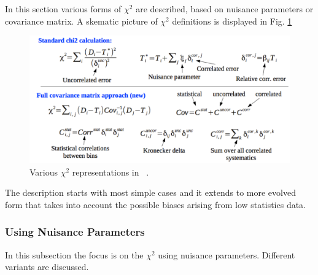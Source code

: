\label{sec:chi2}
In this section various forms of $\chi^2$ are described, based on nuisance parameters or
covariance matrix.
A skematic picture of $\chi^2$ definitions is displayed in Fig. \ref{fig:chi2}
\begin{figure}
\begin{center}
\includegraphics[width=0.75\linewidth]{figures/chi2.pdf}
\end{center}
\caption{Various $\chi^2$ representations in \fitter\ .}
\label{fig:chi2}
\end{figure}
 The description starts with most simple cases and it extends to 
 more evolved form that takes into account the
 possible biases arising from low statistics data. 



\subsubsection{Using Nuisance Parameters}

In this subsection the focus is on the $\chi^2$ using nuisance parameters. Different variants are discussed.


